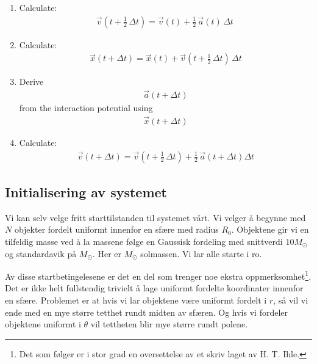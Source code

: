 \documentclass[11pt, twocolumn]{article}
\begin{document}
\begin{enumerate}
\item Calculate: \begin{align*}
\vec{v}\left(t + \tfrac12\,\Delta t\right) = \vec{v}(t) + \tfrac12\,\vec{a}(t)\,\Delta t\ 
\end{align*}


\item Calculate: \begin{align*} \vec{x}(t + \Delta t) = \vec{x}(t) + \vec{v}\left(t + \tfrac12\,\Delta t\right)\, \Delta t \end{align*}


\item Derive \begin{align*} \vec{a}(t + \Delta t) 
\end{align*} from the interaction potential using \begin{align*} \vec{x}(t + \Delta t) \end{align*}


\item Calculate: \begin{align*} \vec{v}(t + \Delta t) = \vec{v}\left(t + \tfrac12\,\Delta t\right) + \tfrac12\,\vec{a}(t + \Delta t)\Delta t \end{align*}
\end{enumerate}

\subsection{Initialisering av systemet}
Vi kan selv velge fritt starttilstanden til systemet vårt. Vi velger å
begynne med $N$ objekter fordelt uniformt innenfor en sfære med
radius $R_0$. Objektene gir vi en tilfeldig masse ved å la massene
følge en Gaussisk fordeling med snittverdi $10M_\odot$ og standardavik
på $M_\odot$. Her er $M_\odot$ solmassen. Vi lar alle starte i ro. 

Av disse startbetingelesene er det en del som trenger noe ekstra
oppmerksomhet\footnote{Det som følger er i stor grad en oversettelse
  av et skriv laget av H. T. Ihle.}. Det er ikke helt fullstendig trivielt å lage uniformt
fordelte koordinater innenfor en sfære. Problemet er at hvis vi lar
objektene være uniformt fordelt i $r$, så vil vi ende med en mye
større tetthet rundt midten av sfæren. Og hvis vi fordeler objektene
uniformt i $\theta$ vil tettheten blir mye større rundt polene. 
\end{document}
